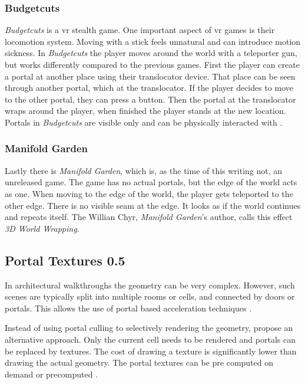 \subsubsection{Budgetcuts}
\textit{Budgetcuts} is a \gls{vr} stealth game. One important aspect of \gls{vr} games is their locomotion system. Moving with a stick feels unnatural and can introduce motion sickness. In \textit{Budgetcuts} the player moves around the world with a teleporter gun, but works differently compared to the previous games. First the player can create a portal at another place using their translocator device. That place can be seen through another portal, which at the translocator. If the player decides to move to the other portal, they can press a button. Then the portal at the translocator wraps around the player, when finished the player stands at the new location. Portals in \textit{Budgetcuts} are visible only and can be physically interacted with \cite{budgetcuts, gdc:budgetcuts}.

\subsubsection{Manifold Garden}
Lastly there is \textit{Manifold Garden}, which is, as the time of this writing not, an unreleased game. The game has no actual portals, but the edge of the world acts as one. When moving to the edge of the world, the player gets teleported to the other edge. There is no visible seam at the edge. It looks as if the world continues and repeats itself. The Willian Chyr, \textit{Manifold Garden}'s author, calls this effect \textit{3D World Wrapping}.

\subsection{Portal Textures 0.5}
In architectural walkthroughs the geometry can be very complex. However, such scenes are typically split into multiple rooms or cells, and connected by doors or portals. This allows the use of portal based acceleration techniques \cite{aliaga:1997:architectural}.

Instead of using portal culling to selectively rendering the geometry, \textcite{aliaga:1997:architectural} propose an alternative approach. Only the current cell needs to be rendered and portals can be replaced by textures. The cost of drawing a texture is significantly lower than drawing the actual geometry. The portal textures can be pre computed on demand or precomputed \cite{aliaga:1997:architectural}. 

